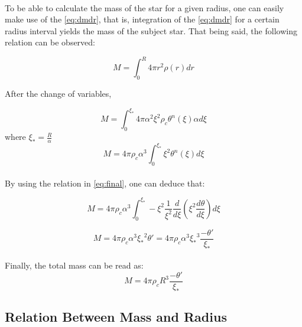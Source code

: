 \documentclass[letterpaper,12pt]{article}
\begin{document}
\paragraph{} To be able to calculate the mass of the star for a given radius, one can easily make use of the \eqref{eq:dmdr}, that is, integration of the \eqref{eq:dmdr} for a certain radius interval yields the mass of the subject star. That being said, the following relation can be observed:

\begin{equation*}
   M =  \int_0^R {4\pi r^2 \rho(r)}dr
\end{equation*}

After the change of variables,

\begin{equation*}
    M = \int_0^{\xi_*} {4 \pi \alpha^2 \xi^2 \rho_c \theta^n (\xi)} \alpha d\xi
\end{equation*}
where ${\xi_*} = \frac{R}{\alpha}$
\begin{equation*}
    M =4 \pi \rho_c \alpha^3 \int_0^{\xi_*} {\xi^2 \theta^n (\xi)} d\xi
\end{equation*}

\paragraph{} By using the relation in \eqref{eq:final}, one can deduce that:

\begin{equation*}
    M =4 \pi \rho_c \alpha^3 \int_0^{\xi_*} -{\xi^2 \frac{1}{\xi^2}\frac{d}{d\xi}\left(\xi^2\frac{d\theta}{d\xi}\right) } d\xi
\end{equation*}

\begin{equation*}
    M = 4 \pi \rho_c \alpha^3 {\xi_*}^2 \theta' = 4 \pi \rho_c \alpha^3 {\xi_*}^3 \frac{-\theta'}{{\xi_*}}
\end{equation*}
\paragraph{} Finally, the total mass can be read as:
\begin{equation}
    \label{eq:mass}
\boxed{ M = 4 \pi \rho_c R^3 \frac{-\theta'}{{\xi_*}}}
\end{equation}


\subsection{Relation Between Mass and Radius}
\end{document}
